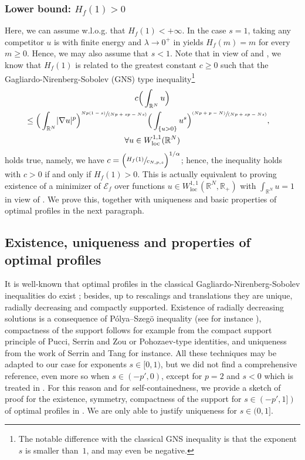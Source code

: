 \documentclass[10pt]{amsart}
\newcommand{\spfrac}[2]{{\sfrac{#1}{(#2)}}}
\newcommand{\pspfrac}[2]{{\sfrac{(#1)}{(#2)}}}
\theoremstyle{plain}
\theoremstyle{definition}
\newcommand{\R}{\mathbb{R}}
\newcommand{\ener}{\mathcal{E}}
\newcommand{\loc}{\mathrm{loc}}
\DeclarePairedDelimiter{\abs}{\lvert}{\rvert}
\begin{document}
\subsubsection*{Lower bound: $H_f(1)>0$} Here, we can assume w.l.o.g. that $H_f(1)<+\infty$. In the case $s=1$, taking any competitor $u$ is with finite energy and $\lambda\to 0^+$ in  yields $H_f(m)=m$ for every $m\geq 0$. Hence, we may also assume that $s<1$. Note that in view of  and , we know that $H_f(1)$ is related to the greatest constant $c\geq 0$ such that the Gagliardo-Nirenberg-Sobolev (GNS) type inequality\footnote{The notable difference with the classical GNS inequality is that the exponent $s$ is smaller than~$1$, and may even be negative.}
\begin{multline}\label{GNS_type_inequality}
c\Big(\int_{\R^N}u\Big)\\
\shoveright{\leq\Big(\int_{\R^N}\abs{\nabla u}^p\Big)^{\spfrac{Np(1-s)}{Np+sp-Ns}}\Big(\int_{\{u>0\}}u^s\Big)^{\pspfrac{Np+p-N}{Np+sp-Ns}},}\\
\forall u\in W^{1,1}_{\loc}(\R^N)
\end{multline}
holds true, namely, we have $c=\Big(\sfrac{H_f(1)}{c_{N,p,s}}\Big)^{1/\alpha}$; hence, the inequality  holds with $c>0$ if and only if $H_f(1)>0$. This is actually equivalent to proving existence of a minimizer of $\ener_f$ over functions $u\in W^{1,1}_{\loc}(\R^N,\R_+)$ with $\int_{\R^N}u=1$ in view of . We prove this, together with uniqueness and basic properties of optimal profiles in the next paragraph.

\subsection*{Existence, uniqueness and properties of optimal profiles} It is well-known that optimal profiles in the classical Gagliardo-Nirenberg-Sobolev inequalities do exist ; besides, up to rescalings and translations they are unique, radially decreasing and compactly supported. Existence of radially decreasing solutions is a consequence of Pólya–Szegö inequality (see for instance \cite{brothersMinimalRearrangementsSobolev1988}), compactness of the support follows for example from the compact support principle of Pucci, Serrin and Zou \cite{pucciStrongMaximumPrinciple1999} or Pohozaev-type identities, and uniqueness from the work of Serrin and Tang \cite{serrinUniquenessGroundStates2000} for instance. All these techniques may be adapted to our case for exponents $s\in [0,1)$, but we did not find a comprehensive reference, even more so when $s \in (-p',0)$, except for $p=2$ and $s<0$ which is treated in \cite{dubsProblemesPerturbationsSingulieres1998}. For this reason and for self-containedness, we provide a sketch of proof for the existence, symmetry, compactness of the support for $s\in (-p',1])$ of optimal profiles in . We are only able to justify uniqueness for $s\in (0,1]$.
\end{document}
